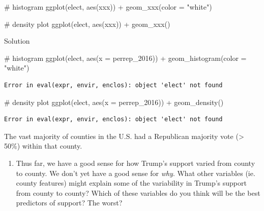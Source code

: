 \documentclass[
  letterpaper,
  DIV=11,
  numbers=noendperiod]{scrreprt}
\newenvironment{Shaded}{\begin{snugshade}}{\end{snugshade}}
\newcommand{\AttributeTok}[1]{\textcolor[rgb]{0.40,0.45,0.13}{#1}}
\newcommand{\CommentTok}[1]{\textcolor[rgb]{0.37,0.37,0.37}{#1}}
\newcommand{\FunctionTok}[1]{\textcolor[rgb]{0.28,0.35,0.67}{#1}}
\newcommand{\NormalTok}[1]{\textcolor[rgb]{0.00,0.23,0.31}{#1}}
\newcommand{\SpecialCharTok}[1]{\textcolor[rgb]{0.37,0.37,0.37}{#1}}
\newcommand{\StringTok}[1]{\textcolor[rgb]{0.13,0.47,0.30}{#1}}
\providecommand{\tightlist}{%
  \setlength{\itemsep}{0pt}\setlength{\parskip}{0pt}}\usepackage{longtable,booktabs,array}
\begin{document}
\begin{Shaded}
\begin{Highlighting}[]
\CommentTok{\# histogram}
\FunctionTok{ggplot}\NormalTok{(elect, }\FunctionTok{aes}\NormalTok{(xxx)) }\SpecialCharTok{+}
  \FunctionTok{geom\_xxx}\NormalTok{(}\AttributeTok{color =} \StringTok{"white"}\NormalTok{)}

\CommentTok{\# density plot}
\FunctionTok{ggplot}\NormalTok{(elect, }\FunctionTok{aes}\NormalTok{(xxx)) }\SpecialCharTok{+}
  \FunctionTok{geom\_xxx}\NormalTok{()}
\end{Highlighting}
\end{Shaded}

Solution

\begin{Shaded}
\begin{Highlighting}[]
\CommentTok{\# histogram}
\FunctionTok{ggplot}\NormalTok{(elect, }\FunctionTok{aes}\NormalTok{(}\AttributeTok{x =}\NormalTok{ perrep\_2016)) }\SpecialCharTok{+}
  \FunctionTok{geom\_histogram}\NormalTok{(}\AttributeTok{color =} \StringTok{"white"}\NormalTok{)}
\end{Highlighting}
\end{Shaded}

\begin{verbatim}
Error in eval(expr, envir, enclos): object 'elect' not found
\end{verbatim}

\begin{Shaded}
\begin{Highlighting}[]
\CommentTok{\# density plot}
\FunctionTok{ggplot}\NormalTok{(elect, }\FunctionTok{aes}\NormalTok{(}\AttributeTok{x =}\NormalTok{ perrep\_2016)) }\SpecialCharTok{+}
  \FunctionTok{geom\_density}\NormalTok{()}
\end{Highlighting}
\end{Shaded}

\begin{verbatim}
Error in eval(expr, envir, enclos): object 'elect' not found
\end{verbatim}

The vast majority of counties in the U.S. had a Republican majority vote
(\textgreater{} 50\%) within that county.

\begin{enumerate}
\def\labelenumi{\alph{enumi}.}
\setcounter{enumi}{1}
\tightlist
\item
  Thus far, we have a good sense for how Trump's support varied from
  county to county. We don't yet have a good sense for \emph{why}. What
  other variables (ie. county features) might explain some of the
  variability in Trump's support from county to county? Which of these
  variables do you think will be the best predictors of support? The
  worst?
\end{enumerate}
\end{document}
